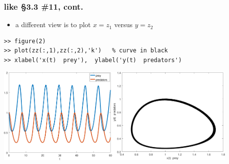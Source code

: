 \documentclass[urlcolor=blue,dvipsnames]{beamer}
\begin{document}
\begin{frame}[fragile]
\frametitle{like \S3.3 \#11, cont.}

\begin{itemize}
\item a different view is to plot $x=z_1$ versus $y=z_2$
\end{itemize}

\begin{Verbatim}[fontsize=\small]
>> figure(2)
>> plot(zz(:,1),zz(:,2),'k')   % curve in black
>> xlabel('x(t)  prey'),  ylabel('y(t)  predators')
\end{Verbatim}

\bigskip
\includegraphics[width=0.44\textwidth]{figs/lotka-time}\quad \includegraphics[width=0.46\textwidth]{figs/lotka-phase}
\end{frame}
\end{document}
